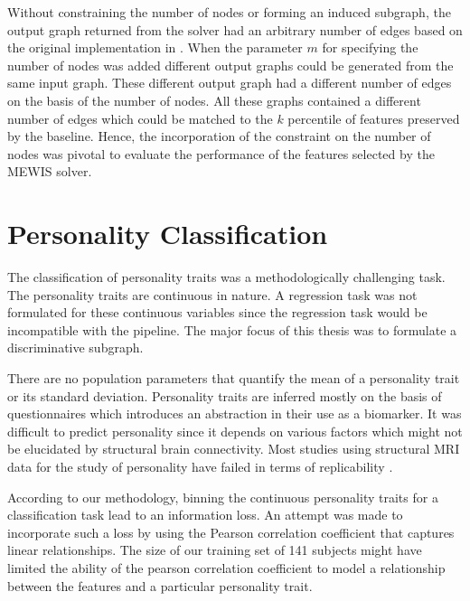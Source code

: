 \documentclass[msthesis.tex]{subfiles}
\begin{document}
Without constraining the number of nodes or forming an induced subgraph, the output graph returned from the solver had an arbitrary number of edges based on the original implementation in \cite{DBLP:journals/corr/LobodaAS16}. When the parameter $m$ for specifying the number of nodes was added different output graphs could be generated from the same input graph. These different output graph had a different number of edges on the basis of the number of nodes. All these graphs contained a different number of edges which could be matched to the $k$ percentile of features preserved by the baseline. Hence, the incorporation of the constraint on the number of nodes was pivotal to evaluate the performance of the features selected by the \gls{MEWIS} solver.
\iffalse
The optimal number of nodes for classification. The solver only starts preserving edges from three nodes. This observation is expected since with two nodes there will be only one edge. Starting with three nodes, we start to obtain a connected graph.

Independent of the type of feature used the number of edges obtained as a function of the number of nodes remained almost the same. Furthermore, it was seen that smaller subgraphs were more effective than larger subgraphs. The classification metrics remain the most important determinants of deciding the number of nodes. 
\fi
\section{Personality Classification}
The classification of personality traits was a methodologically challenging task. The personality traits are continuous in nature. A regression task was not formulated for these continuous variables since the regression task would be incompatible with the pipeline. The major focus of this thesis was to formulate a discriminative subgraph.

There are no population parameters that quantify the mean of a personality trait or its standard deviation. Personality traits are inferred mostly on the basis of questionnaires which introduces an abstraction in their use as a biomarker. It was difficult to predict personality since it depends on various factors which might not be elucidated by structural brain connectivity. Most studies using structural MRI data for the study of personality have failed in terms of replicability \citep{dubois2018resting}. 

According to our methodology, binning the continuous personality traits for a classification task lead to an information loss. An attempt was made to incorporate such a loss by using the Pearson correlation coefficient that captures linear relationships. The size of our training set of 141 subjects might have limited the ability of the pearson correlation coefficient to model a relationship between the features and a particular personality trait.
\end{document}
